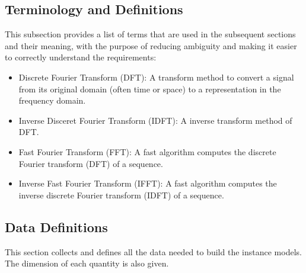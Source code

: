 \documentclass[12pt]{article}
\begin{document}
\subsection{Terminology and  Definitions}

This subsection provides a list of terms that are used in the subsequent
sections and their meaning, with the purpose of reducing ambiguity and making it
easier to correctly understand the requirements:

\begin{itemize} \item Discrete Fourier Transform (DFT):
A transform method to convert a signal from
its original domain (often time or space) to a representation in the frequency
domain. \end{itemize}

\begin{itemize} \item Inverse Disceret Fourier Transform (IDFT): 
 A inverse transform method of DFT. \end{itemize}

\begin{itemize} \item Fast Fourier Transform (FFT): A fast algorithm computes the
discrete Fourier transform (DFT) of a sequence. \end{itemize}

\begin{itemize} \item Inverse Fast Fourier Transform (IFFT): A fast algorithm
computes the inverse discrete Fourier transform (IDFT) of a sequence.
\end{itemize}

\subsection{Data Definitions} \label{sec_datadef}

This section collects and defines all the data needed to build the instance
models. The dimension of each quantity is also given. ~\newline
\end{document}

